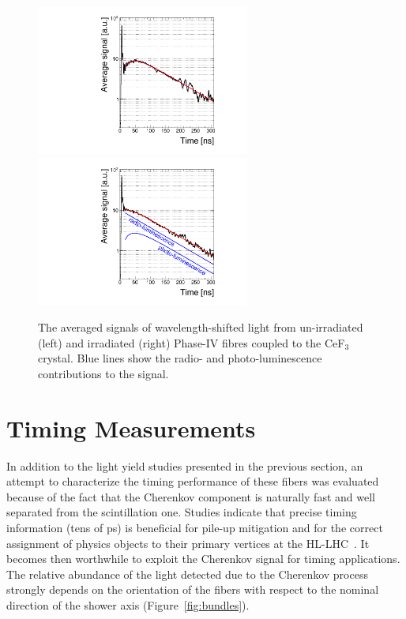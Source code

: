 \documentclass[a4paper,11pt]{article}
\begin{document}
\begin{figure}[ht]
\begin{center}
        \includegraphics[width=7cm]{Figures/CeF3coupledFibersUnirrad.pdf}
        \includegraphics[width=7cm]{Figures/CeF3coupledFibersIrrad.pdf}
    \caption{\small The averaged signals of wavelength-shifted light from un-irradiated (left) and irradiated (right) Phase-IV fibres coupled to the CeF$_3$ crystal. Blue lines show the radio- and photo-luminescence contributions to the signal. }
    \label{fig:CeF3signals}
\end{center}
\end{figure}

\section{Timing Measurements}
\label{sec:timing}
In addition to the light yield studies presented in the previous section, an attempt to characterize the timing performance of these fibers was evaluated because of the fact that the Cherenkov component is naturally fast and well separated from the scintillation one. Studies indicate that precise timing information (tens of ps) is beneficial for pile-up mitigation and for the correct assignment of physics objects to their primary vertices at the HL-LHC~\cite{r-timingATLAS,r-timingCMS}. It becomes then worthwhile to exploit the Cherenkov signal for timing applications.  The relative abundance of the light detected due to the Cherenkov process  strongly depends on the orientation of the fibers with respect to the nominal direction of the shower axis (Figure~\ref{fig:bundles}). 
\end{document}

